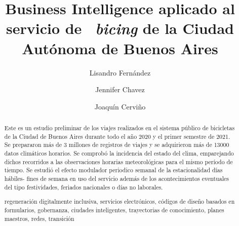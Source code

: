 \documentclass[runningheads,a4paper,spanish]{llncs}
\newcommand{\keywords}[1]{\par\addvspace\baselineskip
\noindent\keywordname\enspace\ignorespaces#1}
\begin{document}
\mainmatter  %

\title{Business Intelligence aplicado al servicio de ~\textit{bicing} de la Ciudad Autónoma de Buenos Aires}


%
%
\author{Lisandro Fernández \and Jennifer Chavez \and Joaquín Cerviño}
%


\tocauthor{}
\maketitle

\begin{abstract}

Este es un estudio preliminar de los viajes realizados en el sistema público de
bicicletas de la Ciudad de Buenos Aires durante todo el año 2020 y el primer
semestre de 2021.
Se prepararon más de 3 millones de registros de viajes y se adquirieron más de
13000 datos climáticos horarios. Se comprobó la incidencia
del estado del clima, emparejando dichos recorridos a las observaciones
horarias meteorológicas para el mismo período de tiempo.
Se estudió el efecto modulador periodico semanal de la estacionalidad días
hábiles- fines de semana en uso del servicio además de los acontecimientos
eventuales del tipo festividades, feriados nacionales o días
no laborales.

\keywords{
regeneración digitalmente inclusiva, servicios electrónicos,
códigos de diseño basados en formularios, gobernanza, ciudades inteligentes,
trayectorias de conocimiento, planes maestros, redes, 
transición
}
\end{abstract}
\end{document}
